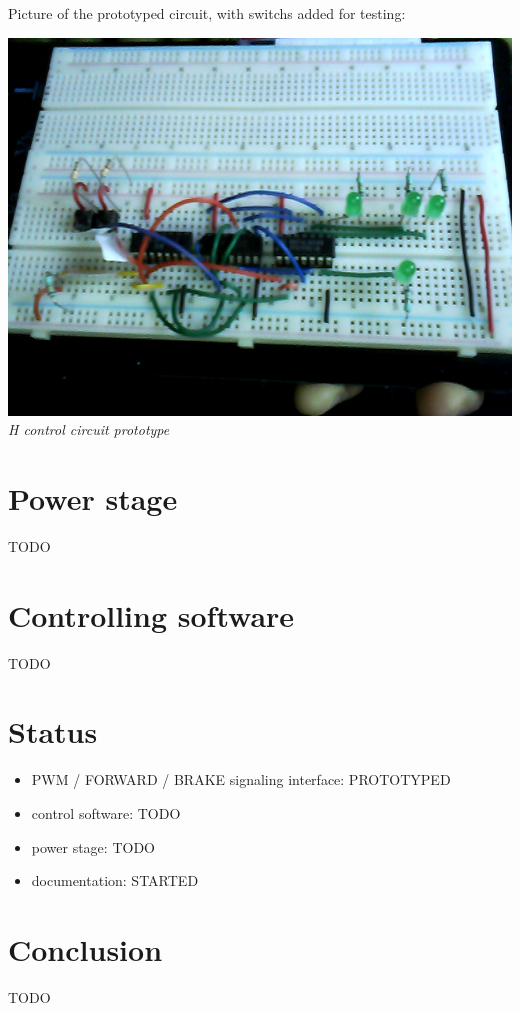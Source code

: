 \documentclass[12pt]{article}
\begin{document}
\smallskip
\pagebreak
Picture of the prototyped circuit, with switchs added for testing:
\begin{center}
  \includegraphics[keepaspectratio=true, width=1.\textwidth]{../pics/h_control_breadboard.png}
  \\
  \smallskip
  \tiny{\textit{H control circuit prototype}}
\end{center}


\newpage
\section{Power stage}
TODO


\newpage
\section{Controlling software}
TODO


\newpage
\section{Status}
\begin{itemize}
  \item PWM / FORWARD / BRAKE signaling interface: PROTOTYPED
  \item control software: TODO
  \item power stage: TODO
  \item documentation: STARTED
\end{itemize}


\newpage
\section{Conclusion}
TODO
\end{document}
